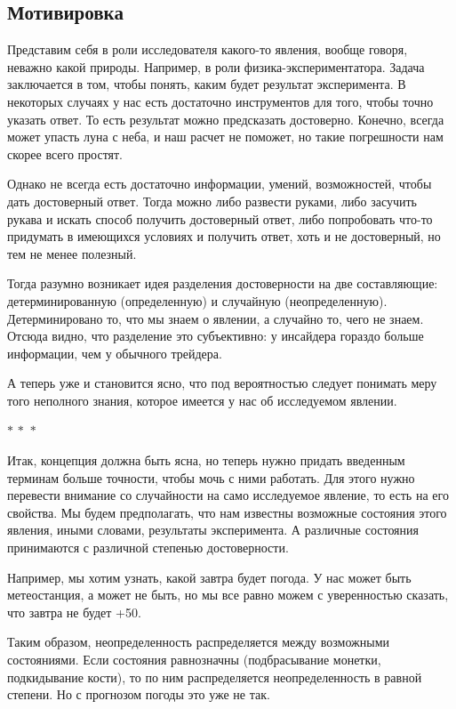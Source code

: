 \documentclass[a4paper,12pt]{article}
\newcommand{\threestars}{\begin{center}$ {\ast}\,{\ast}\,{\ast} $\end{center}}
\newcounter{th-counter}
\begin{document}
\subsection*{Мотивировка}
Представим себя в роли исследователя какого-то явления, вообще говоря, неважно какой природы. Например, в роли физика-экспериментатора. Задача заключается в том, чтобы понять, каким будет результат эксперимента. В некоторых случаях у нас есть достаточно инструментов для того, чтобы точно указать ответ. То есть результат можно предсказать достоверно. Конечно, всегда может упасть луна с неба, и наш расчет не поможет, но такие погрешности нам скорее всего простят.

Однако не всегда есть достаточно информации, умений, возможностей, чтобы дать достоверный ответ. Тогда можно либо развести руками, либо засучить рукава и искать способ получить достоверный ответ, либо попробовать что-то придумать в имеющихся условиях и получить ответ, хоть и не достоверный, но тем не менее полезный.

Тогда разумно возникает идея разделения достоверности на две составляющие: детерминированную (определенную) и случайную (неопределенную). Детерминировано то, что мы знаем о явлении, а случайно то, чего не знаем. Отсюда видно, что разделение это субъективно: у инсайдера гораздо больше информации, чем у обычного трейдера.

А теперь уже и становится ясно, что под вероятностью следует понимать меру того неполного знания, которое имеется у нас об исследуемом явлении.

\threestars

Итак, концепция должна быть ясна, но теперь нужно придать введенным терминам больше точности, чтобы мочь с ними работать. Для этого нужно перевести внимание со случайности на само исследуемое явление, то есть на его свойства. Мы будем предполагать, что нам известны возможные состояния этого явления, иными словами, результаты эксперимента. А различные состояния принимаются с различной степенью достоверности.

Например, мы хотим узнать, какой завтра будет погода. У нас может быть метеостанция, а может не быть, но мы все равно можем с уверенностью сказать, что завтра не будет +50.

Таким образом, неопределенность распределяется между возможными состояниями. Если состояния равнозначны (подбрасывание монетки, подкидывание кости), то по ним распределяется неопределенность в равной степени. Но с прогнозом погоды это уже не так.
\end{document}
